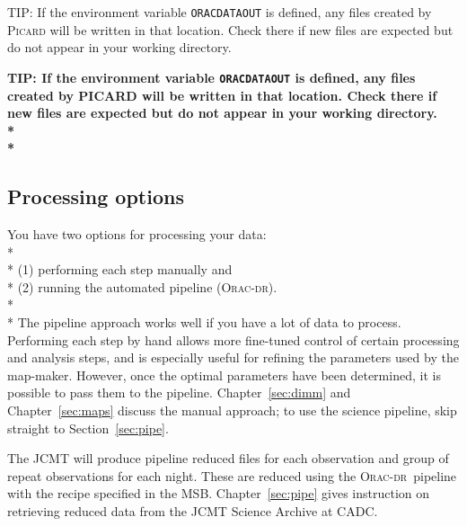 \documentclass[twoside,11pt]{article}
\newcommand{\htmladdnormallink}[2]{#1}
\newcommand{\htmlref}[2]{#1}
\newenvironment{latexonly}{}{}
\newcommand{\latexhtml}[2]{#1}
\newcommand{\xlabel}[1]{}
\renewcommand{\_}{\texttt{\symbol{95}}}
\newenvironment{fmpage}[1]{\begin{lrbox}{\fmbox}\begin{minipage}{#1}}{\end{minipage}\end{lrbox}\fbox{\usebox{\fmbox}}}
\newcommand{\oracdr}{\htmladdnormallink{\textsc{Orac-dr}}{http://www.oracdr.org/oracdr}}
\newcommand{\envvar}[1]{\texttt{#1}}
\newcommand{\cref}[3]{\latexhtml{#1~\ref{#2}}{\htmlref{#3}{#2}}}
\begin{document}
\begin{latexonly}
\begin{center}
\begin{fmpage}{0.95\linewidth}
\vspace{0.1cm}
TIP: If the environment variable \envvar{ORAC\_DATA\_OUT} is defined, any files
created by \textsc{Picard} will be written in that location. Check there if new
files are expected but do not appear in your working directory.
\end{fmpage}
\end{center}
\end{latexonly}

\begin{htmlonly}
\textbf{TIP: If the environment variable \envvar{ORAC\_DATA\_OUT} is defined,
any files created by PICARD will be written in that location. Check
there if new files are expected but do not appear in your working
directory.\\*\\*}
\end{htmlonly}

\subsection{\xlabel{options}Processing options}

You have two options for processing your data:
\\*\\*
(1) performing each step manually and\\*
(2) running the automated pipeline (\textsc{Orac-dr}).
\\*\\*
The pipeline approach works well if you have a lot of data to process.
Performing each step by hand allows more fine-tuned control of certain
processing and analysis steps, and is especially useful for refining
the parameters used by the map-maker. However, once the optimal
parameters have been determined, it is possible to pass them to the
pipeline. \cref{Chapter}{sec:dimm}{The Dynamic Iterative Map-maker Explained}
and \cref{Chapter}{sec:maps}{Reducing Your Data} discuss the manual approach;
to use the science pipeline, skip
straight to \cref{Section}{sec:pipe}{The SCUBA-2 Pipeline}.

The JCMT will produce pipeline reduced files for each observation and
group of repeat observations for each night. These are reduced using
the \oracdr\ pipeline with the recipe specified in the MSB.
\cref{Chapter}{sec:pipe}{The SCUBA-2 Pipeline} gives instruction on
retrieving reduced data from the
\htmladdnormallink{JCMT Science Archive}{http://www3.cadc-ccda.hia-iha.nrc-cnrc.gc.ca/jcmt/}
at CADC.
\end{document}
